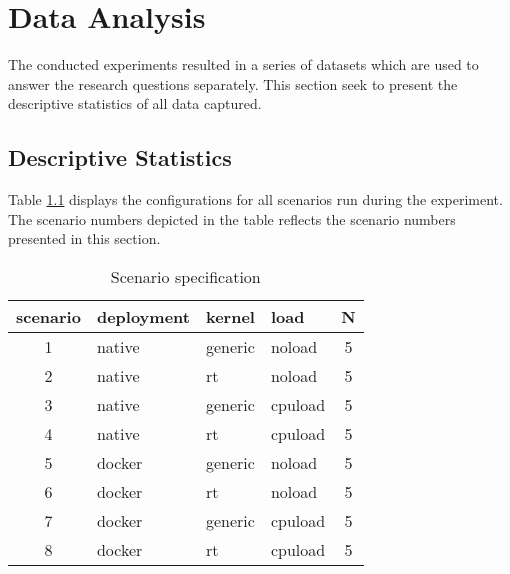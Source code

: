 \iffalse  \fi
\chapter{Data Analysis} \label{section:data-analysis} 

The conducted experiments resulted in a series of datasets which are used to answer the research questions separately. This section seek to present the descriptive statistics of all data captured.



\section{Descriptive Statistics}

Table \ref{tab:scen-table} displays the configurations for all scenarios run during the experiment. The scenario numbers depicted in the table reflects the scenario numbers presented in this section.

\begin{table}[H]
\centering
\caption{Scenario specification}
\label{tab:scen-table}
\begin{tabular}{|c|l|l|l|c|}
\hline
\textbf{scenario} & \textbf{deployment} & \textbf{kernel} & \textbf{load} & \textbf{N} \\ \hline
1                 & native              & generic         & noload  	  &	5		   \\
2                 & native              & rt              & noload  	  &	5		   \\
3                 & native              & generic         & cpuload  	  &	5		   \\
4                 & native              & rt              & cpuload  	  &	5		   \\
5                 & docker              & generic         & noload   	  &	5		   \\
6                 & docker              & rt              & noload   	  &	5		   \\
7                 & docker              & generic         & cpuload  	  &	5		   \\
8                 & docker              & rt              & cpuload  	  &	5		   \\ \hline
\end{tabular}
\end{table}


